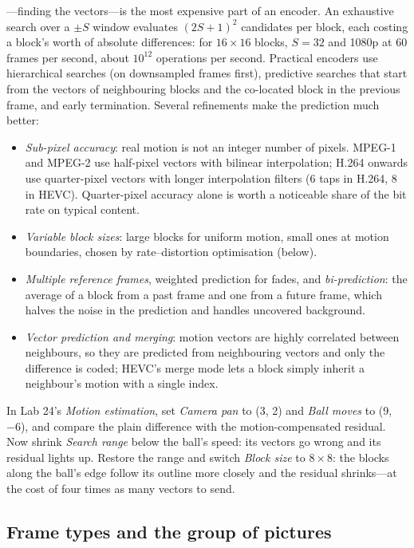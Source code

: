 ---finding the vectors---is the most expensive part of an encoder. An exhaustive
search over a $\pm S$ window evaluates $(2S+1)^2$ candidates per block, each costing a block's worth of
absolute differences: for $16\times16$ blocks, $S=32$ and 1080p at 60 frames per second, about $10^{12}$
operations per second. Practical encoders use hierarchical searches (on downsampled frames first),
predictive searches that start from the vectors of neighbouring blocks and the co-located block in the
previous frame, and early termination. Several refinements make the prediction much better:
\begin{itemize}[nosep]
\item \emph{Sub-pixel accuracy}: real motion is not an integer number of pixels. MPEG-1 and MPEG-2 use
half-pixel vectors with bilinear interpolation; H.264 onwards use quarter-pixel vectors with longer
interpolation filters (6 taps in H.264, 8 in HEVC). Quarter-pixel accuracy alone is worth a noticeable
share of the bit rate on typical content.
\item \emph{Variable block sizes}: large blocks for uniform motion, small ones at motion boundaries,
chosen by rate--distortion optimisation (below).
\item \emph{Multiple reference frames}, weighted prediction for fades, and \emph{bi-prediction}: the
average of a block from a past frame and one from a future frame, which halves the noise in the
prediction and handles uncovered background.
\item \emph{Vector prediction and merging}: motion vectors are highly correlated between neighbours, so
they are predicted from neighbouring vectors and only the difference is coded; HEVC's merge mode lets a
block simply inherit a neighbour's motion with a single index.
\end{itemize}

\begin{tryit}
In Lab 24's \emph{Motion estimation}, set \emph{Camera pan} to (3, 2) and \emph{Ball moves} to
(9, $-6$), and compare the plain difference with the motion-compensated residual. Now shrink
\emph{Search range} below the ball's speed: its vectors go wrong and its residual lights up. Restore
the range and switch \emph{Block size} to $8\times8$: the blocks along the ball's edge follow its
outline more closely and the residual shrinks---at the cost of four times as many vectors to send.
\end{tryit}

\subsection{Frame types and the group of pictures}

